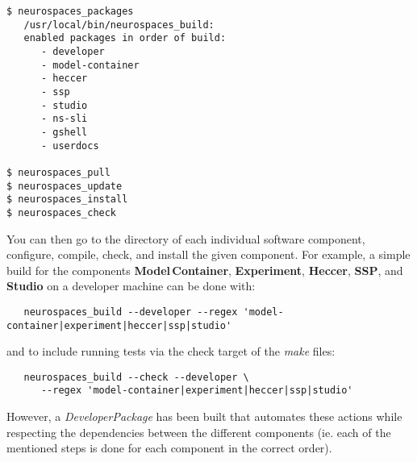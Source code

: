 \documentclass[12pt]{article}
\begin{document}
\begin{enumerate}
\begin{verbatim}
$ neurospaces_packages
   /usr/local/bin/neurospaces_build:
   enabled packages in order of build:
      - developer
      - model-container
      - heccer
      - ssp
      - studio
      - ns-sli
      - gshell
      - userdocs

$ neurospaces_pull
$ neurospaces_update
$ neurospaces_install
$ neurospaces_check
\end{verbatim}
\end{enumerate}

You can then go to the directory of each individual software component, configure, compile, check, and install the given component. For example, a simple build for the components {\bf Model\,Container}, {\bf Experiment}, {\bf Heccer}, {\bf SSP}, and {\bf Studio} on a developer machine can be done with:  
\begin{verbatim}
   neurospaces_build --developer --regex 'model-container|experiment|heccer|ssp|studio'
\end{verbatim}
and to include running tests via the check target of the {\it make} files:
\begin{verbatim}
   neurospaces_build --check --developer \
      --regex 'model-container|experiment|heccer|ssp|studio'
\end{verbatim}
However, a {\it DeveloperPackage} has been built that automates these actions while respecting the dependencies between the different components (ie. each of the mentioned steps is done for each component in the correct order).




\end{document}
